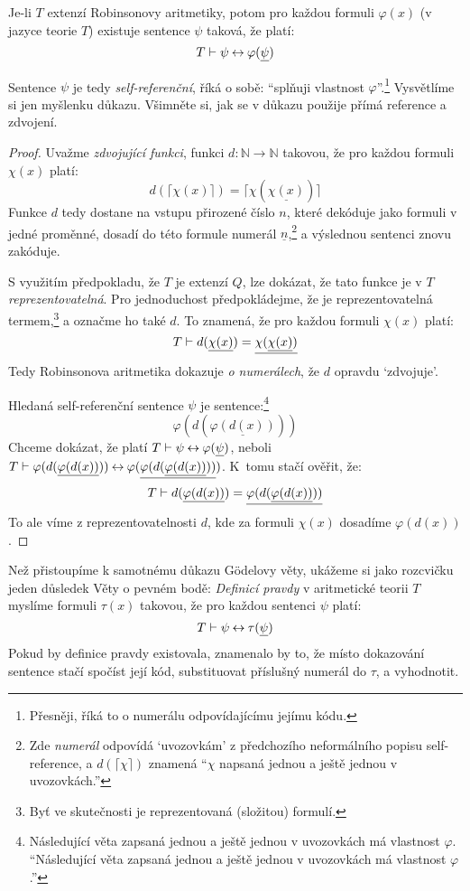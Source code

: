 \begin{theorem}
Je-li $T$ extenzí Robinsonovy aritmetiky, potom pro každou formuli $\varphi(x)$ (v jazyce teorie $T$) existuje sentence $\psi$ taková, že platí: 
$$
T\vdash \psi \mathbin{\leftrightarrow} \varphi(\underline{\psi})
$$
\end{theorem}
Sentence $\psi$ je tedy \emph{self-referenční}, říká o sobě: ``splňuji vlastnost $\varphi$''.\footnote{Přesněji, říká to o numerálu odpovídajícímu jejímu kódu.} Vysvětlíme si jen myšlenku důkazu. Všimněte si, jak se v důkazu použije přímá reference a zdvojení.
\begin{proof} Uvažme \emph{zdvojující funkci}, funkci $d\colon\mathbb N\to\mathbb N$ takovou, že pro každou formuli $\chi(x)$ platí:
$$
d(\lceil \chi(x)\rceil)=\lceil\chi(\underline{\chi(x)})\rceil
$$
Funkce $d$ tedy dostane na vstupu přirozené číslo $n$, které dekóduje jako formuli v jedné proměnné, dosadí do této formule numerál $\underline{n}$,\footnote{Zde \emph{numerál} odpovídá `uvozovkám' z předchozího neformálního popisu self-reference, a $d(\lceil\chi\rceil)$ znamená ``$\chi$ napsaná jednou a ještě jednou v uvozovkách.''} a výslednou sentenci znovu zakóduje.

S využitím předpokladu, že $T$ je extenzí $Q$, lze dokázat, že tato funkce je v $T$ \emph{reprezentovatelná}. Pro jednoduchost předpokládejme, že je reprezentovatelná termem,\footnote{Byť ve skutečnosti je reprezentovaná (složitou) formulí.} a označme ho také $d$. To znamená, že pro každou formuli $\chi(x)$ platí:
$$
T\vdash d(\underline{\chi(x)})=\underline{\chi(\underline{\chi(x)})}
$$
Tedy Robinsonova aritmetika dokazuje \emph{o numerálech}, že $d$ opravdu `zdvojuje'.

Hledaná self-referenční sentence $\psi$ je sentence:\footnote{Následující věta zapsaná jednou a ještě jednou v uvozovkách má vlastnost $\varphi$. ``Následující věta zapsaná jednou a ještě jednou v uvozovkách má vlastnost $\varphi$.''}
$$
\varphi(d(\underline{\varphi(d(x))}))
$$
Chceme dokázat, že platí $T\vdash \psi \mathbin{\leftrightarrow} \varphi(\underline{\psi})$, neboli $T \vdash \varphi(d(\underline{\varphi(d(x))}))\mathbin{\leftrightarrow}\varphi(\underline{\varphi(d(\underline{\varphi(d(x))}))})$. K~tomu stačí ověřit, že:
$$
T \vdash d(\underline{\varphi(d(x))})=\underline{\varphi(d(\underline{\varphi(d(x))}))}
$$
To ale víme z reprezentovatelnosti $d$, kde za formuli $\chi(x)$ dosadíme $\varphi(d(x))$.
\end{proof}

Než přistoupíme k samotnému důkazu Gödelovy věty, ukážeme si jako rozcvičku jeden důsledek Věty o pevném bodě: \emph{Definicí pravdy} v aritmetické teorii $T$ myslíme formuli $\tau(x)$ takovou, že pro každou sentenci $\psi$ platí: 
$$
T\vdash\psi\mathbin{\leftrightarrow}\tau(\underline{\psi})
$$
Pokud by definice pravdy existovala, znamenalo by to, že místo dokazování sentence stačí spočíst její kód, substituovat příslušný numerál do $\tau$, a vyhodnotit.

